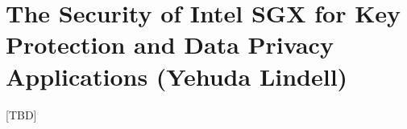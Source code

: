 \section{The Security of Intel SGX for Key Protection and Data Privacy
Applications (Yehuda Lindell)}

[TBD]
